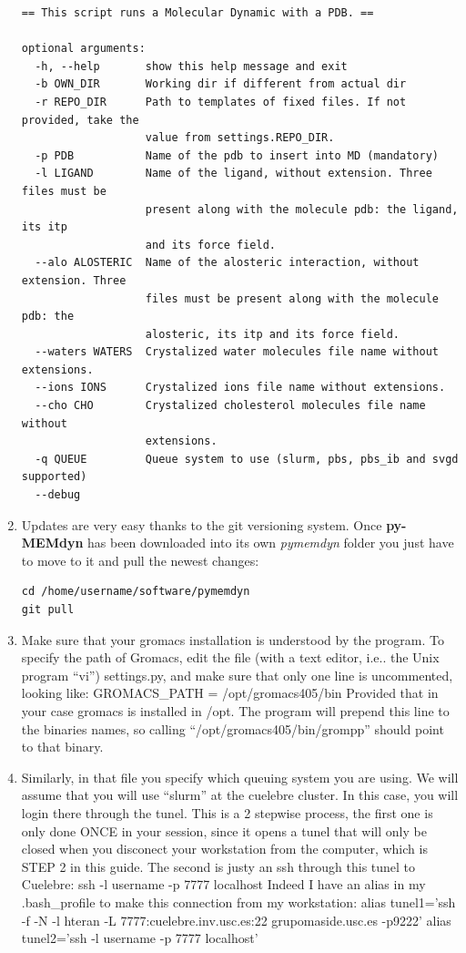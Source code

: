 \documentclass[10pt, oneside, pdftex]{article}
\begin{document}
\begin{enumerate}
\begin{Verbatim}
== This script runs a Molecular Dynamic with a PDB. ==

optional arguments:
  -h, --help       show this help message and exit
  -b OWN_DIR       Working dir if different from actual dir
  -r REPO_DIR      Path to templates of fixed files. If not provided, take the
                   value from settings.REPO_DIR.
  -p PDB           Name of the pdb to insert into MD (mandatory)
  -l LIGAND        Name of the ligand, without extension. Three files must be
                   present along with the molecule pdb: the ligand, its itp
                   and its force field.
  --alo ALOSTERIC  Name of the alosteric interaction, without extension. Three
                   files must be present along with the molecule pdb: the
                   alosteric, its itp and its force field.
  --waters WATERS  Crystalized water molecules file name without extensions.
  --ions IONS      Crystalized ions file name without extensions.
  --cho CHO        Crystalized cholesterol molecules file name without
                   extensions.
  -q QUEUE         Queue system to use (slurm, pbs, pbs_ib and svgd supported)
  --debug
\end{Verbatim}

\item{Updates are very easy thanks to the git versioning system. Once \textbf{py-MEMdyn} 
has been downloaded into its own \textit{pymemdyn} folder you just have to 
move to it and pull the newest changes:
\begin{Verbatim}
cd /home/username/software/pymemdyn
git pull 
\end{Verbatim}
}

\item{Make sure  that your gromacs  installation is understood  by the
  program. To specify the path of  Gromacs, edit the file (with a text
  editor, i.e..  the Unix program  ``vi'') settings.py, and  make sure
  that  only one line  is uncommented,  looking like:  GROMACS\_PATH =
  /opt/gromacs405/bin Provided that in  your case gromacs is installed
  in /opt. The  program will prepend this line  to the binaries names,
  so  calling  ``/opt/gromacs405/bin/grompp''  should  point  to  that
  binary.}

\item{Similarly, in that file you specify which queuing system you are
  using.  We will  assume that you will use  ``slurm'' at the cuelebre
  cluster. In this case, you  will login there through the tunel. This
  is a  2 stepwise process,  the first one  is only done ONCE  in your
  session, since  it opens a tunel  that will only be  closed when you
  disconect your  workstation from  the computer, which  is STEP  2 in
  this  guide.  The second  is  justy an  ssh  through  this tunel  to
  Cuelebre: ssh -l  username -p 7777 localhost Indeed  I have an alias
  in my  .bash\_profile to make  this connection from  my workstation:
  alias  tunel1='ssh -f  -N -l  hteran  -L 7777:cuelebre.inv.usc.es:22
  grupomaside.usc.es  -p9222' alias  tunel2='ssh -l  username  -p 7777
  localhost'

}
\end{enumerate}
\end{document}
